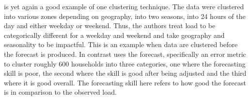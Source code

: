 \citet{char14} is yet again a good example of one clustering technique. The data were clustered into various zones depending on geography, into two seasons, into 24 hours of the day and either weekday or weekend. Thus, the authors treat load to be categorically different for a weekday and weekend and take geography and seasonality to be impactful. This is an example when data are clustered before the forecast is produced. In contrast \cite{dan14} uses the forecast, specifically an error metric to cluster roughly 600 households into three categories, one where the forecasting skill is poor, the second where the skill is good after being adjusted and the third where it is good overall. The forecasting skill here refers to how good the forecast is in comparison to the observed load.

